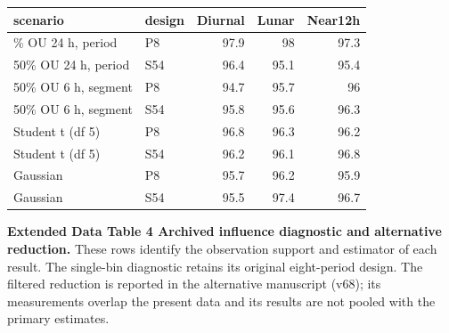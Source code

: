 \documentclass[
  12pt,
  a4paper,
]{article}
\begin{document}
\begin{longtable}[]{@{}llrrr@{}}
\toprule\noalign{}
scenario & design & Diurnal & Lunar & Near12h \\
\midrule\noalign{}
\endhead
\bottomrule\noalign{}
\endlastfoot
50\% OU 24 h, period & P8 & 97.9 & 98 & 97.3 \\
50\% OU 24 h, period & S54 & 96.4 & 95.1 & 95.4 \\
50\% OU 6 h, segment & P8 & 94.7 & 95.7 & 96 \\
50\% OU 6 h, segment & S54 & 95.8 & 95.6 & 96.3 \\
Student t (df 5) & P8 & 96.8 & 96.3 & 96.2 \\
Student t (df 5) & S54 & 96.2 & 96.1 & 96.8 \\
Gaussian & P8 & 95.7 & 96.2 & 95.9 \\
Gaussian & S54 & 95.5 & 97.4 & 96.7 \\
\end{longtable}

\clearpage

\textbf{Extended Data Table 4 \textbar{} Archived influence diagnostic
and alternative reduction.} These rows identify the observation support
and estimator of each result. The single-bin diagnostic retains its
original eight-period design. The filtered reduction is reported in the
alternative manuscript (v68); its measurements overlap the present data
and its results are not pooled with the primary estimates.
\end{document}
